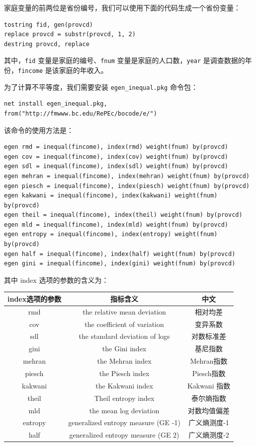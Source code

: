 \documentclass[]{ctexbook}
\begin{document}
家庭变量的前两位是省份编号，我们可以使用下面的代码生成一个省份变量：

\begin{lstlisting}
tostring fid, gen(provcd)
replace provcd = substr(provcd, 1, 2)
destring provcd, replace
\end{lstlisting}

其中，\texttt{fid} 变量是家庭的编号、\texttt{fnum} 变量是家庭的人口数，\texttt{year} 是调查数据的年份，\texttt{fincome} 是该家庭的年收入。

为了计算不平等度，我们需要安装 \texttt{egen\_inequal.pkg} 命令包：

\begin{lstlisting}
net install egen_inequal.pkg, from("http://fmwww.bc.edu/RePEc/bocode/e/")
\end{lstlisting}

该命令的使用方法是：

\begin{lstlisting}
egen rmd = inequal(fincome), index(rmd) weight(fnum) by(provcd)
egen cov = inequal(fincome), index(cov) weight(fnum) by(provcd)
egen sdl = inequal(fincome), index(sdl) weight(fnum) by(provcd)
egen mehran = inequal(fincome), index(mehran) weight(fnum) by(provcd)
egen piesch = inequal(fincome), index(piesch) weight(fnum) by(provcd)
egen kakwani = inequal(fincome), index(kakwani) weight(fnum) by(provcd)
egen theil = inequal(fincome), index(theil) weight(fnum) by(provcd)
egen mld = inequal(fincome), index(mld) weight(fnum) by(provcd)
egen entropy = inequal(fincome), index(entropy) weight(fnum) by(provcd)
egen half = inequal(fincome), index(half) weight(fnum) by(provcd)
egen gini = inequal(fincome), index(gini) weight(fnum) by(provcd)
\end{lstlisting}

其中 index 选项的参数的含义为：

\begin{longtable}[]{@{}ccc@{}}
\toprule
index选项的参数 & 指标含义 & 中文\tabularnewline
\midrule
\endhead
rmd & the relative mean deviation & 相对均差\tabularnewline
cov & the coefficient of variation & 变异系数\tabularnewline
sdl & the standard deviation of logs & 对数标准差\tabularnewline
gini & the Gini index & 基尼指数\tabularnewline
mehran & the Mehran index & Mehran指数\tabularnewline
piesch & the Piesch index & Piesch指数\tabularnewline
kakwani & the Kakwani index & Kakwani 指数\tabularnewline
theil & Theil entropy index & 泰尔熵指数\tabularnewline
mld & the mean log deviation & 对数均值偏差\tabularnewline
entropy & generalized entropy measure (GE -1) & 广义熵测度-1\tabularnewline
half & generalized entropy measure (GE 2) & 广义熵测度-2\tabularnewline
\bottomrule
\end{longtable}
\end{document}
